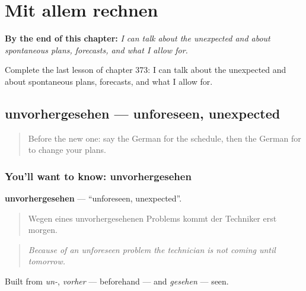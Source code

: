 
\chapter{Mit allem rechnen}
\label{ch:ge-mit-allem-rechnen}

\begin{chapteropening}
\textbf{By the end of this chapter:} \emph{I can talk about the unexpected and about spontaneous plans, forecasts, and what I allow for.}

Complete the last lesson of chapter 373: I can talk about the unexpected and about spontaneous plans, forecasts, and what I allow for.
\end{chapteropening}

\section[unvorhergesehen]{unvorhergesehen — unforeseen, unexpected}

\label{lesson:GE-C373-unvorhergesehen}



\begin{quote}
Before the new one: say the German for the schedule, then the German for to change your plans.
\end{quote}

\subsection*{You'll want to know: unvorhergesehen}
\textbf{unvorhergesehen} — \textquotedblleft{}unforeseen, unexpected\textquotedblright{}.

\begin{quote}
Wegen eines unvorhergesehenen Problems kommt der Techniker erst morgen.
\end{quote}

\begin{quote}
\emph{Because of an unforeseen problem the technician is not coming until tomorrow.}
\end{quote}

Built from \emph{un-}, \emph{vorher} — beforehand — and \emph{gesehen} — seen.

